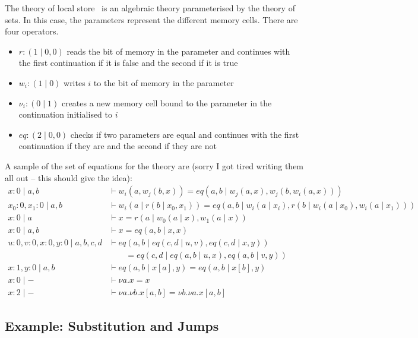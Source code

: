 \documentclass{scrartcl}
\theoremstyle{definition}
\begin{document}
The theory of local store~\cite{staton_instances_2013} is an algebraic theory parameterised by the theory of sets. In this case, the parameters represent the different memory cells. There are four operators.
\begin{itemize}
    \item $r : (1\mid 0, 0)$ reads the bit of memory in the parameter and continues with the first continuation if it is false and the second if it is true
    \item $w_i : (1 \mid 0)$ writes $i$ to the bit of memory in the parameter
    \item $\nu_i : (0 \mid 1)$ creates a new memory cell bound to the parameter in the continuation initialised to $i$
    \item $eq : (2\mid 0, 0)$ checks if two parameters are equal and continues with the first continuation if they are and the second if they are not
\end{itemize}
A sample of the set of equations for the theory are (sorry I got tired writing them all out -- this should give the idea):
\begin{align*}
    x: 0 \mid a, b &\vdash w_i(a,w_j(b, x)) = eq(a,b\mid w_j(a, x), w_j(b, w_i(a,x))) \\
    x_0:0,x_1:0\mid a,b &\vdash w_i(a\mid r(b\mid x_0,x_1)) = eq(a,b\mid w_i(a\mid x_i), r(b \mid w_i(a\mid x_0), w_i(a\mid x_1))) \\
    x:0 \mid a &\vdash x = r(a\mid w_0(a\mid x), w_1(a\mid x)) \\
    x:0 \mid a,b &\vdash x = eq(a,b\mid x,x) \\
    u:0,v:0,x:0,y:0\mid a,b,c,d &\vdash eq(a,b \mid eq(c,d \mid u,v), eq(c,d \mid x,y)) \\
    &\qquad = eq(c,d\mid eq(a,b\mid u,x), eq(a,b\mid v,y)) \\
    x:1,y:0 \mid a,b &\vdash eq(a,b\mid x[a],y) = eq(a,b\mid x[b],y) \\
    x: 0 \mid - &\vdash \nu a.x = x \\
    x: 2 \mid - &\vdash \nu a.\nu b.x[a,b] = \nu b.\nu a.x[a,b]
\end{align*}

\subsection{Example: Substitution and Jumps}
\end{document}
